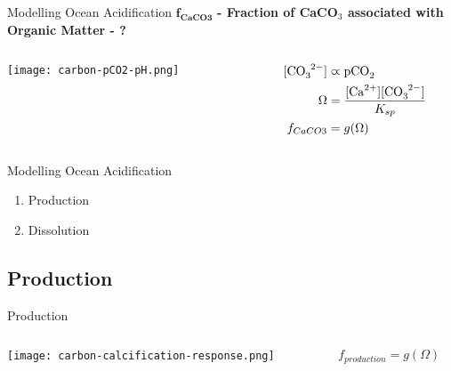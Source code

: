 \documentclass[aspectratio=169]{beamer}
\begin{document}
\begin{frame}{Modelling Ocean Acidification}
    $\mathbf{f_{CaCO3}}$ \textbf{- Fraction of CaCO$_3$ associated with Organic Matter - {\color{QESdarkblue} \ce{\Omega}?}}
    
    \bigskip
    \begin{columns}
        \begin{column}{0.5\linewidth}
            \centering
            \texttt{[image: carbon-pCO2-pH.png]}
        \end{column}
        \begin{column}{0.5\linewidth}
            \begin{align*}
                \ce{[CO3^{2-}]} &\varpropto \ce{pCO2}\\
                \Omega &= \frac{\ce{[Ca^{2+}][CO3^{2-}]}}{K_{sp}} \\
                f_{CaCO3} &= g(\Omega) \\
            \end{align*}
            
        \end{column}
    \end{columns}
\end{frame}

\begin{frame}{Modelling Ocean Acidification}
    \begin{enumerate}
        \item {} Production
        \item {} Dissolution
    \end{enumerate}
\end{frame}

\subsection{Production}

\begin{frame}{Production}
    \begin{columns}
        \begin{column}{0.45\linewidth}
            \centering
            \texttt{[image: carbon-calcification-response.png]}
        \end{column}
        \begin{column}{0.55\linewidth}
            $$f_{production} = g(\Omega)$$
        \end{column}
    \end{columns}
\end{frame}
\end{document}
